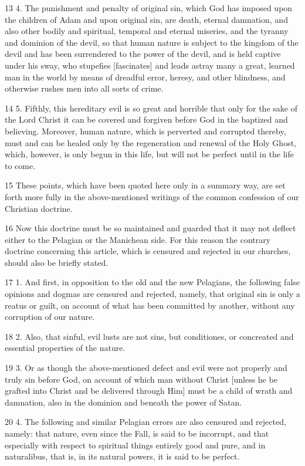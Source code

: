 13 4. The punishment and penalty of original sin, which God has imposed upon the children of Adam and upon original sin, are death, eternal damnation, and also other bodily and spiritual, temporal and eternal miseries, and the tyranny and dominion of the devil, so that human nature is subject to the kingdom of the devil and has been surrendered to the power of the devil, and is held captive under his sway, who stupefies [fascinates] and leads astray many a great, learned man in the world by means of dreadful error, heresy, and other blindness, and otherwise rushes men into all sorts of crime.

14 5. Fifthly, this hereditary evil is so great and horrible that only for the sake of the Lord Christ it can be covered and forgiven before God in the baptized and believing. Moreover, human nature, which is perverted and corrupted thereby, must and can be healed only by the regeneration and renewal of the Holy Ghost, which, however, is only begun in this life, but will not be perfect until in the life to come.

15 These points, which have been quoted here only in a summary way, are set forth more fully in the above-mentioned writings of the common confession of our Christian doctrine.

16 Now this doctrine must be so maintained and guarded that it may not deflect either to the Pelagian or the Manichean side. For this reason the contrary doctrine concerning this article, which is censured and rejected in our churches, should also be briefly stated.

17 1. And first, in opposition to the old and the new Pelagians, the following false opinions and dogmas are censured and rejected, namely, that original sin is only a reatus or guilt, on account of what has been committed by another, without any corruption of our nature.

18 2. Also, that sinful, evil lusts are not sins, but conditiones, or concreated and essential properties of the nature.

19 3. Or as though the above-mentioned defect and evil were not properly and truly sin before God, on account of which man without Christ [unless he be grafted into Christ and be delivered through Him] must be a child of wrath and damnation, also in the dominion and beneath the power of Satan.

20 4. The following and similar Pelagian errors are also censured and rejected, namely: that nature, even since the Fall, is said to be incorrupt, and that especially with respect to spiritual things entirely good and pure, and in naturalibus, that is, in its natural powers, it is said to be perfect.

